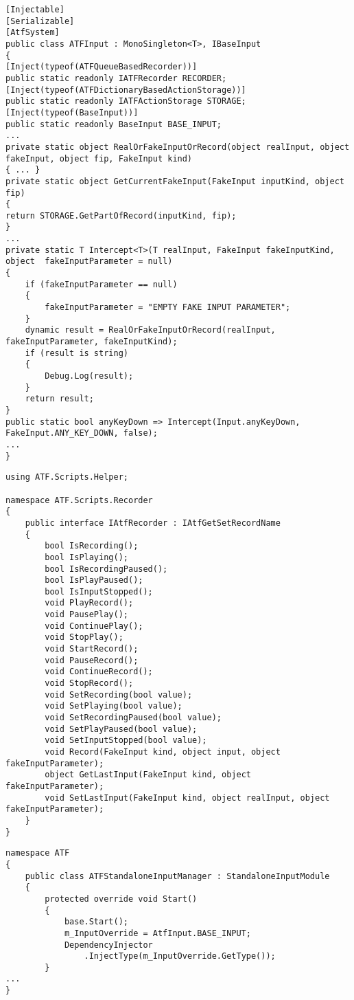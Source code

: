 \begin{lstlisting}[caption={Бизнес-логика системы симуляции и перехвата ввода},label=input]
[Injectable]
[Serializable]
[AtfSystem]
public class ATFInput : MonoSingleton<T>, IBaseInput
{
[Inject(typeof(ATFQueueBasedRecorder))]
public static readonly IATFRecorder RECORDER;
[Inject(typeof(ATFDictionaryBasedActionStorage))]
public static readonly IATFActionStorage STORAGE;
[Inject(typeof(BaseInput))]
public static readonly BaseInput BASE_INPUT;
...
private static object RealOrFakeInputOrRecord(object realInput, object fakeInput, object fip, FakeInput kind)
{ ... }
private static object GetCurrentFakeInput(FakeInput inputKind, object fip)
{
return STORAGE.GetPartOfRecord(inputKind, fip);
}
...
private static T Intercept<T>(T realInput, FakeInput fakeInputKind, object 	fakeInputParameter = null)
{
    if (fakeInputParameter == null)
    {
        fakeInputParameter = "EMPTY FAKE INPUT PARAMETER";
    }
    dynamic result = RealOrFakeInputOrRecord(realInput, fakeInputParameter, fakeInputKind);
    if (result is string)
    {
        Debug.Log(result);
    }
    return result;
}
public static bool anyKeyDown => Intercept(Input.anyKeyDown, FakeInput.ANY_KEY_DOWN, false);
...
}
\end{lstlisting}

\begin{lstlisting}[caption={Интерфейc модуля записи},label=iRecorder]
using ATF.Scripts.Helper;

namespace ATF.Scripts.Recorder
{
    public interface IAtfRecorder : IAtfGetSetRecordName
    {
        bool IsRecording();
        bool IsPlaying();
        bool IsRecordingPaused();
        bool IsPlayPaused();
        bool IsInputStopped();
        void PlayRecord();
        void PausePlay();
        void ContinuePlay();
        void StopPlay();
        void StartRecord();
        void PauseRecord();
        void ContinueRecord();
        void StopRecord();
        void SetRecording(bool value);
        void SetPlaying(bool value);
        void SetRecordingPaused(bool value);
        void SetPlayPaused(bool value);
        void SetInputStopped(bool value);
        void Record(FakeInput kind, object input, object fakeInputParameter);
        object GetLastInput(FakeInput kind, object fakeInputParameter);
        void SetLastInput(FakeInput kind, object realInput, object fakeInputParameter);
    }
}
\end{lstlisting}

\begin{lstlisting}[caption={Пользовательский модуль ввода для ATFInput},label=inputModule]
namespace ATF
{
	public class ATFStandaloneInputManager : StandaloneInputModule
	{
		protected override void Start()
        {
            base.Start();
            m_InputOverride = AtfInput.BASE_INPUT;
            DependencyInjector
            	.InjectType(m_InputOverride.GetType());
        }
...
}
\end{lstlisting}

